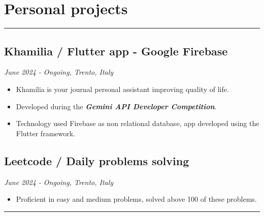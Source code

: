 \documentclass[a4paper,10pt]{article}
\begin{document}
\begin{minipage}[t]{0.25\textwidth}
    \section*{Personal projects}
    \vspace{3.4cm} %
    \rule{0.6cm}{0.3mm}
\end{minipage}
\hfill
\begin{minipage}[t]{0.75\textwidth}
     \subsection*{Khamilia / Flutter app - Google Firebase }
    \textit{June 2024 - Ongoing, Trento, Italy} \\
    \begin{itemize}[leftmargin=1cm]
        \item Khamilia is your journal personal assistant improving quality of life.
        \item Developed during the \textbf{\textit{Gemini API Developer Competition}}.
        \item Technology used Firebase as non relational database, app developed using the Flutter framework.
    \end{itemize}
    \subsection*{Leetcode / Daily problems solving }
    \textit{June 2024 - Ongoing, Trento, Italy} \\
    \begin{itemize}[leftmargin=1cm]
        \item Proficient in easy and medium problems, solved above 100 of these problems. 
    \end{itemize}
    \rule{\linewidth}{0.5mm}
\end{minipage}
\end{document}
